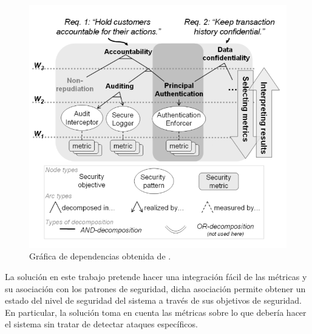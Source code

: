 \begin{figure}[!hp]
  \centering
    \includegraphics[scale=0.45]{Imagenes/fig_depGraph.png}
    \caption{Gráfica de dependencias obtenida de \cite{HeyScaHuy08}.}
    \label{diagrama-tr2}
\end{figure}
%
%
La solución en este trabajo pretende hacer una integración fácil de las métricas y su asociación con los patrones de seguridad, dicha asociación permite obtener un estado del nivel de seguridad del sistema a través de sus objetivos de seguridad. En particular, la solución toma en cuenta las métricas sobre lo que debería hacer el sistema sin tratar de detectar ataques específicos. 
%
%
